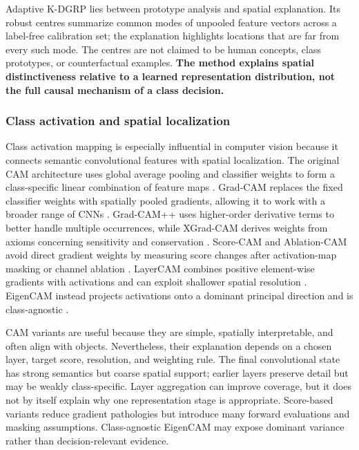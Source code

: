 Adaptive K-DGRP lies between prototype analysis and spatial explanation. Its
robust centres summarize common modes of unpooled feature vectors across a
label-free calibration set; the explanation highlights locations that are far
from every such mode. The centres are not claimed to be human concepts, class
prototypes, or counterfactual examples. \textbf{The method explains spatial
distinctiveness relative to a learned representation distribution, not the
full causal mechanism of a class decision.}

\subsubsection{Class activation and spatial localization}

Class activation mapping is especially influential in computer vision because
it connects semantic convolutional features with spatial localization. The
original CAM architecture uses global average pooling and classifier weights
to form a class-specific linear combination of feature maps
\cite{zhou2016cam}. Grad-CAM replaces the fixed classifier weights with
spatially pooled gradients, allowing it to work with a broader range of CNNs
\cite{selvaraju2017gradcam}. Grad-CAM++ uses higher-order derivative terms to
better handle multiple occurrences, while XGrad-CAM derives weights from
axioms concerning sensitivity and conservation
\cite{chattopadhay2018gradcampp,fu2020xgradcam}. Score-CAM and Ablation-CAM
avoid direct gradient weights by measuring score changes after activation-map
masking or channel ablation
\cite{wang2020scorecam,desai2020ablationcam}. LayerCAM combines positive
element-wise gradients with activations and can exploit shallower spatial
resolution \cite{jiang2021layercam}. EigenCAM instead projects activations
onto a dominant principal direction and is class-agnostic
\cite{muhammad2020eigencam}.

CAM variants are useful because they are simple, spatially interpretable, and
often align with objects. Nevertheless, their explanation depends on a chosen
layer, target score, resolution, and weighting rule. The final convolutional
state has strong semantics but coarse spatial support; earlier layers preserve
detail but may be weakly class-specific. Layer aggregation can improve
coverage, but it does not by itself explain why one representation stage is
appropriate. Score-based variants reduce gradient pathologies but introduce
many forward evaluations and masking assumptions. Class-agnostic EigenCAM may
expose dominant variance rather than decision-relevant evidence.

